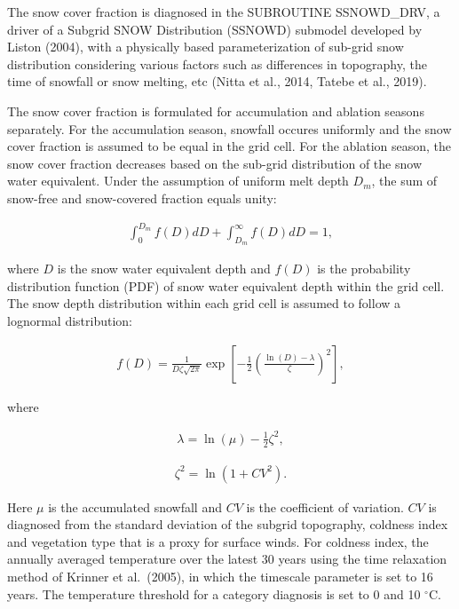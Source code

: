 The snow cover fraction is diagnosed in the SUBROUTINE SSNOWD\_DRV, a driver of a Subgrid SNOW Distribution (SSNOWD) submodel developed by Liston (2004), with a physically based parameterization of
sub-grid snow distribution considering various factors such as differences in topography, the time of snowfall or snow melting, etc (Nitta et al., 2014, Tatebe et al., 2019).

The snow cover fraction is formulated for accumulation and ablation seasons separately. For the accumulation season, snowfall occures uniformly and the snow cover fraction is assumed to be equal in
the grid cell. For the ablation season, the snow cover fraction decreases based on the sub-grid distribution of the snow water equivalent. Under the assumption of uniform melt depth \(D_m\), the sum
of snow-free and snow-covered fraction equals unity:

\begin{eqnarray}
\int_0^{D_m} f(D)dD + \int_{D_m}^\infty f(D)dD = 1, \label{8-1}
\end{eqnarray}

where \(D\) is the snow water equivalent depth and \(f(D)\) is the probability distribution function (PDF) of snow water equivalent depth within the grid cell. The snow depth distribution within each
grid cell is assumed to follow a lognormal distribution:

\begin{eqnarray}
f(D) = \frac{1}{D\zeta\sqrt{2\pi}} \exp{ \left[
 -\frac{1}{2} {\left( \frac{\ln(D)-\lambda}{\zeta} \right)}^2
\right] }, \label{8-2}
\end{eqnarray}

where

\begin{eqnarray}
\lambda = \ln(\mu) - \frac{1}{2}\zeta^2, \label{8-3}
\end{eqnarray}

\begin{eqnarray}
\zeta^2 = \ln(1+CV^2). \label{8-4}
\end{eqnarray}

Here \(\mu\) is the accumulated snowfall and \(CV\) is the coefficient of variation. \(CV\) is diagnosed from the standard deviation of the subgrid topography, coldness index and vegetation type that
is a proxy for surface winds. For coldness index, the annually averaged temperature over the latest 30 years using the time relaxation method of Krinner et al.~(2005), in which the timescale parameter
is set to 16 years. The temperature threshold for a category diagnosis is set to 0 and 10 \(^\circ\mathrm{C}\).

